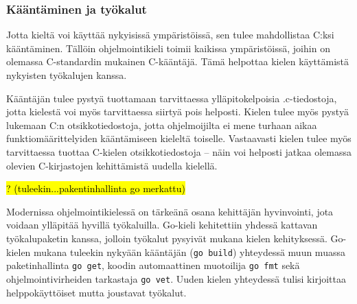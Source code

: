 \subsubsection{Kääntäminen ja työkalut}

Jotta kieltä voi käyttää nykyisissä ympäristöissä, sen tulee mahdollistaa C:ksi
kääntäminen. Tällöin ohjelmointikieli toimii kaikissa ympäristöissä, joihin on
olemassa C-standardin mukainen C-kääntäjä. Tämä helpottaa kielen käyttämistä
nykyisten työkalujen kanssa.



Kääntäjän tulee pystyä tuottamaan tarvittaessa ylläpitokelpoisia .c-tiedostoja,
jotta kielestä voi myös tarvittaessa siirtyä pois helposti.  Kielen tulee myös
pystyä lukemaan C:n otsikkotiedostoja, jotta ohjelmoijilta ei mene turhaan
aikaa funktiomäärittelyiden kääntämiseen kieleltä toiselle. Vastaavasti kielen
tulee myös tarvittaessa tuottaa C-kielen otsikkotiedostoja -- näin voi helposti
jatkaa olemassa olevien C-kirjastojen kehittämistä uudella kielellä.

%

\hl{? (tuleekin...pakentinhallinta go merkattu)}

Modernissa ohjelmointikielessä on tärkeänä osana kehittäjän hyvinvointi, jota
voidaan ylläpitää hyvillä työkaluilla. Go-kieli kehitettiin yhdessä kattavan
työkalupaketin kanssa, jolloin työkalut pysyivät mukana kielen kehityksessä.
Go-kielen mukana tuleekin nykyään kääntäjän (\texttt{go build}) yhteydessä muun
muassa paketinhallinta \texttt{go get}, koodin automaattinen muotoilija
\texttt{go fmt} sekä ohjelmointivirheiden tarkastaja \texttt{go vet}. Uuden
kielen yhteydessä tulisi kirjoittaa helppokäyttöiset mutta joustavat työkalut.



